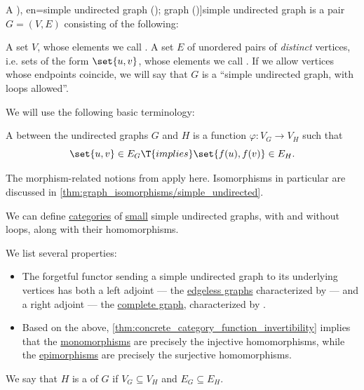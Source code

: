 \begin{definition}\label{def:undirected_graph}
  A \term[ru=неориентированный граф (\cite[9]{ЕмеличевИПр1990ТеорияГрафов}), en=simple undirected graph (\cite[def. 1.1.2]{Knauer2019AlgebraicGraphTheory}); graph (\cite[2]{Diestel2017GraphTheory})]{simple undirected graph} is a pair \( G = (V, E) \) consisting of the following:
  \begin{thmenum}[series=def:undirected_graph]
     A set \( V \), whose elements we call .
     A set \( E \) of unordered pairs of \emph{distinct} vertices, i.e. sets of the form \( \set{ u, v } \), whose elements we call . If we allow vertices whose endpoints coincide, we will say that \( G \) is a \enquote{simple undirected graph, with loops allowed}.
  \end{thmenum}

  We will use the following basic terminology:
  \begin{thmenum}[resume=def:undirected_graph]
     A  between the undirected graphs \( G \) and \( H \) is a function \( \varphi: V_G \to V_H \) such that
    \begin{equation*}
      \set{ u, v } \in E_G \T{implies} \set{ f(u), f(v) } \in E_H.
    \end{equation*}

    The morphism-related notions from  apply here. Isomorphisms in particular are discussed in \cref{thm:graph_isomorphisms/simple_undirected}.

     We can define \hyperref[def:category]{categories} of \hyperref[def:small_set]{small} simple undirected graphs, with and without loops, along with their homomorphisms.

    We list several properties:
    \begin{itemize}
      \item The forgetful functor sending a simple undirected graph to its underlying vertices has both a left adjoint --- the \hyperref[def:edgeless_graph]{edgeless graphs} characterized by  --- and a right adjoint --- the \hyperref[def:complete_graph]{complete graph}, characterized by .

      \item Based on the above, \cref{thm:concrete_category_function_invertibility} implies that the \hyperref[def:morphism_cancellation/left]{monomorphisms} are precisely the injective homomorphisms, while the \hyperref[def:morphism_cancellation/right]{epimorphisms} are precisely the surjective homomorphisms.
    \end{itemize}

     We say that \( H \) is a  of \( G \) if \( V_G \subseteq V_H \) and \( E_G \subseteq E_H \).
  \end{thmenum}
\end{definition}
